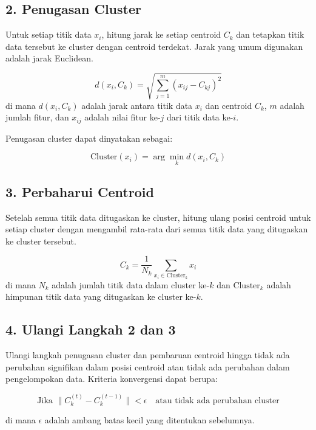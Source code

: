 \documentclass[
  oneside]{book}
\begin{document}
\subsection*{2. Penugasan Cluster}\label{penugasan-cluster}

Untuk setiap titik data \(x_i\), hitung jarak ke setiap centroid \(C_k\) dan tetapkan titik data tersebut ke cluster dengan centroid terdekat. Jarak yang umum digunakan adalah jarak Euclidean.

\[
d(x_i, C_k) = \sqrt{\sum_{j=1}^{m} (x_{ij} - C_{kj})^2}
\]
di mana \(d(x_i, C_k)\) adalah jarak antara titik data \(x_i\) dan centroid \(C_k\), \(m\) adalah jumlah fitur, dan \(x_{ij}\) adalah nilai fitur ke-\(j\) dari titik data ke-\(i\).

Penugasan cluster dapat dinyatakan sebagai:

\[
\text{Cluster}(x_i) = \arg\min_{k} d(x_i, C_k)
\]

\subsection*{3. Perbaharui Centroid}\label{perbaharui-centroid}

Setelah semua titik data ditugaskan ke cluster, hitung ulang posisi centroid untuk setiap cluster dengan mengambil rata-rata dari semua titik data yang ditugaskan ke cluster tersebut.

\[
C_k = \frac{1}{N_k} \sum_{x_i \in \text{Cluster}_k} x_i
\]
di mana \(N_k\) adalah jumlah titik data dalam cluster ke-\(k\) dan \(\text{Cluster}_k\) adalah himpunan titik data yang ditugaskan ke cluster ke-\(k\).

\subsection*{4. Ulangi Langkah 2 dan 3}\label{ulangi-langkah-2-dan-3}

Ulangi langkah penugasan cluster dan pembaruan centroid hingga tidak ada perubahan signifikan dalam posisi centroid atau tidak ada perubahan dalam pengelompokan data. Kriteria konvergensi dapat berupa:

\[
\text{Jika } \| C_k^{(t)} - C_k^{(t-1)} \| < \epsilon \quad \text{atau tidak ada perubahan cluster}
\]

di mana \(\epsilon\) adalah ambang batas kecil yang ditentukan sebelumnya.
\end{document}
